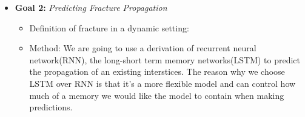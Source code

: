 \begin{itemize}
\item \textbf{Goal 2:} \emph{Predicting Fracture Propagation} 
\begin{itemize} 
    \item Definition of fracture in a dynamic setting:
    
    \item Method: We are going to use a derivation of recurrent neural network(RNN), the long-short term memory networks(LSTM) to predict the propagation of an existing interstices. The reason why we choose LSTM over RNN is that it's a more flexible model and can control how much of a memory we would like the model to contain when making predictions.
    
    
    
    
    
\end{itemize}



\end{itemize}

